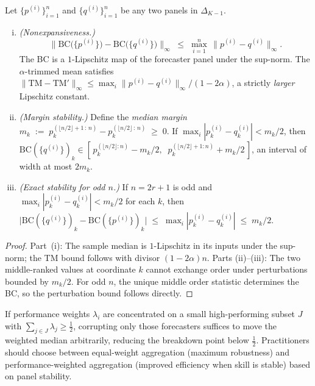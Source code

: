 \begin{proposition}
\label{prop:margin_full}
Let $\{p^{(i)}\}_{i=1}^n$ and $\{q^{(i)}\}_{i=1}^n$ be any two panels in $\Delta_{K-1}$.

\begin{enumerate}[(i)]
\item \textit{(Nonexpansiveness.)}
\begin{equation}
\bigl\|\mathrm{BC}\!\bigl(\{p^{(i)}\}\bigr) - \mathrm{BC}\!\bigl(\{q^{(i)}\}\bigr)\bigr\|_\infty
\;\le\; \max_{i=1}^n \,\|p^{(i)} - q^{(i)}\|_\infty.
\end{equation}
The BC is a $1$-Lipschitz map of the forecaster panel under the sup-norm.
The $\alpha$-trimmed mean satisfies
$\|\mathrm{TM} - \mathrm{TM}'\|_\infty \le \max_i\|p^{(i)}-q^{(i)}\|_\infty / (1-2\alpha)$,
a strictly \emph{larger} Lipschitz constant.

\item \textit{(Margin stability.)}
Define the \emph{median margin}
$m_k \;:=\; p^{(\lfloor n/2\rfloor + 1\,:\,n)}_k - p^{(\lfloor n/2\rfloor\,:\,n)}_k \;\ge\; 0$.
If $\max_i |p^{(i)}_k - q^{(i)}_k| < m_k/2$, then
$\mathrm{BC}(\{q^{(i)}\})_k \in
[\,p^{(\lfloor n/2\rfloor:n)}_k - m_k/2,\;\; p^{(\lfloor n/2\rfloor+1:n)}_k + m_k/2\,]$,
an interval of width at most $2m_k$.

\item \textit{(Exact stability for odd $n$.)}
If $n = 2r+1$ is odd and $\max_i |p^{(i)}_k - q^{(i)}_k| < m_k/2$ for each $k$, then
$\bigl|\mathrm{BC}(\{q^{(i)}\})_k - \mathrm{BC}(\{p^{(i)}\})_k\bigr| \;\le\;
\max_i |p^{(i)}_k - q^{(i)}_k| \;\le\; m_k/2$.
\end{enumerate}
\end{proposition}

\begin{proof}
Part~(i): The sample median is $1$-Lipschitz in its inputs under the sup-norm; the TM bound
follows with divisor $(1-2\alpha)n$.  Parts (ii)--(iii): The two middle-ranked values at
coordinate $k$ cannot exchange order under perturbations bounded by $m_k/2$.
For odd $n$, the unique middle order statistic determines the BC, so the perturbation bound
follows directly.
\end{proof}

\begin{remark}
If performance weights $\lambda_i$ are concentrated on a small high-performing subset $J$ with
$\sum_{j\in J}\lambda_j \ge \tfrac12$, corrupting only those forecasters suffices to move the
weighted median arbitrarily, reducing the breakdown point below $\tfrac12$.  Practitioners
should choose between equal-weight aggregation (maximum robustness) and performance-weighted
aggregation (improved efficiency when skill is stable) based on panel stability.
\end{remark}

